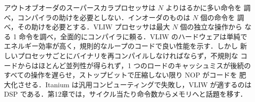 \documentclass[../main.tex]{subfiles}
\begin{document}
\begin{keypoint}[章のまとめ]
  アウトオブオーダのスーパースカラプロセッサは $N$ よりはるかに多い命令を
  調べ，コンパイラの助けを必要としない．インオーダのものは $N$ 個の命令を
  調べ，その助けを必要とする．VLIW プロセッサは最大 $N$ 個の独立な操作から
  なる 1 命令を調べ，全面的にコンパイラに頼る．VLIW のハードウェアは単純で
  エネルギー効率が高く，規則的なループのコードで良い性能を示す．しかし
  新しいプロセッサごとにバイナリを再コンパイルしなければならず，不規則な
  コードからはほとんど並列性が得られず，1 つのロードのキャッシュミスが後続の
  すべての操作を遅らせ，ストップビットで圧縮しない限り NOP がコードを
  肥大化させる．Itanium は汎用コンピューティングで失敗し，VLIW が適するのは
  DSP である．第12章では，サイクル当たり命令数からメモリへと話題を移す．
\end{keypoint}
\end{document}
